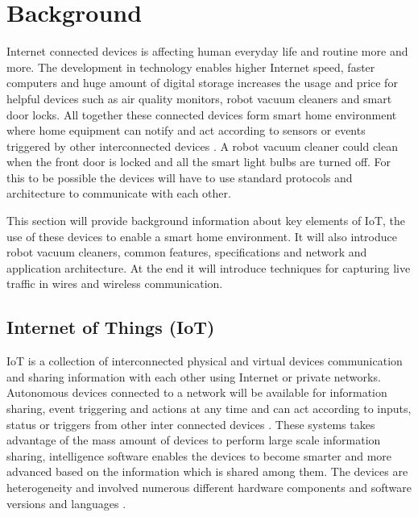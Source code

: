 \chapter{Background}

Internet connected devices is affecting human everyday life and routine more and more. The development in technology enables higher Internet speed, faster computers and huge amount of digital storage increases the usage and price for helpful devices such as air quality monitors, robot vacuum cleaners and smart door locks. All together these connected devices form smart home environment where home equipment can notify and act according to sensors or events triggered by other interconnected devices \cite{atlam2020iot}. A robot vacuum cleaner could clean when the front door is locked and all the smart light bulbs are turned off. For this to be possible the devices will have to use standard protocols and architecture to communicate with each other. 

This section will provide background information about key elements of IoT, the use of these devices to enable a smart home environment. It will also introduce robot vacuum cleaners, common features, specifications and network and application architecture. At the end it will introduce techniques for capturing live traffic in wires and wireless communication. 

\section{Internet of Things (IoT)}
IoT is a collection of interconnected physical and virtual devices communication and sharing information with each other using Internet or private networks. Autonomous devices connected to a network will be available for information sharing, event triggering and actions at any time and can act according to inputs, status or triggers from other inter connected devices \cite{atlam2020iot}. These systems takes advantage of the mass amount of devices to perform large scale information sharing, intelligence software enables the devices to become smarter and more advanced based on the information which is shared among them. The devices are heterogeneity and involved numerous different hardware components and software versions and languages \cite{atlam2020iot}.

